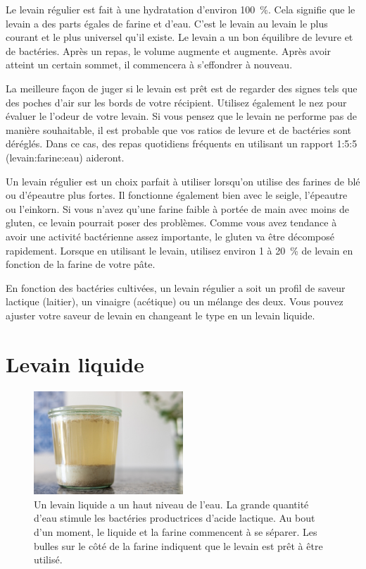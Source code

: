 Le levain régulier est fait à une hydratation d'environ \qty{100}{\percent}.
Cela signifie que le levain a des parts égales de farine et d'eau. C'est le levain au levain le plus
courant et le plus universel qu'il existe. Le levain a un bon
équilibre de levure et de bactéries. Après un repas, le volume augmente et
augmente. Après avoir atteint un certain sommet, il commencera à s'effondrer à nouveau.

La meilleure façon de juger si le levain est prêt est de regarder des signes tels que
des poches d'air sur les bords de votre récipient. Utilisez également le nez pour évaluer le
l'odeur de votre levain. Si vous pensez que le levain ne performe pas de manière
souhaitable, il est probable que vos ratios de levure et de bactéries sont déréglés. Dans ce
cas, des repas quotidiens fréquents en utilisant un rapport 1:5:5 (levain:farine:eau) aideront.

Un levain régulier est un choix parfait à utiliser lorsqu'on utilise des farines de blé ou d'épeautre plus fortes.
Il fonctionne également bien avec le seigle, l'épeautre ou l'einkorn. Si vous n'avez qu'une farine faible
à portée de main avec moins de gluten, ce levain pourrait poser des problèmes. Comme vous avez tendance à avoir
une activité bactérienne assez importante, le gluten va être décomposé rapidement. Lorsque
en utilisant le levain, utilisez environ 1 à \qty{20}{\percent} de levain en fonction de la farine de votre
pâte.

En fonction des bactéries cultivées, un levain régulier a soit un profil de saveur lactique (laitier),
un vinaigre (acétique) ou un mélange des deux. Vous pouvez ajuster votre
saveur de levain en changeant le type en un levain liquide.

\section{Levain liquide}%
\label{section:liquid-starter}

\begin{figure}[!htb]
\begin{center}
  \includegraphics[width=0.5\textwidth]{sourdough-starter-liquid.jpg}
  \caption[Levain liquide]{Un levain liquide a un haut niveau de
      l'eau. La grande quantité d'eau stimule les bactéries productrices d'acide lactique.
      Au bout d'un moment, le liquide et la farine commencent à se séparer. Les bulles sur le
      côté de la farine indiquent que le levain est prêt à être utilisé.}%
  \label{fig:liquid-sourdough-starter}
\end{center}
\end{figure}


